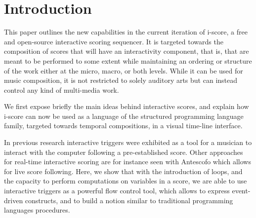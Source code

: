 \documentclass{article}
\title{\papertitle}
\begin{document}
%
\capstartfalse
\maketitle
\capstarttrue
%
\begin{abstract}
     The development and authoring of interactive music or applications, such as user interfaces for arts \& exhibitions
     has traditionally been done with tools that pertain to two broad metaphors. 
     Cue-based environments work by making groups of parameters and sending them to remote devices, 
     while more interactive applications are generally written in generic art-oriented 
     programming environments, such as Max/MSP, Processing or openFrameworks.
     In this paper, we present the current version of the i-score sequencer. 
     It is an extensive graphical software that bridges the gap between time-based, logic-based and flow-based interactive application authoring tools.
     Built upon a few simple and novel primitives that give to the composer the expressive power of structured programming, i-score provides a time line adapted to the notation of parameter-oriented interactive music, 
     and allows temporal scripting using JavaScript. We present the usage of these primitives, as well as an i-score example of work inspired from music based on polyvalent structure.
\end{abstract}
%

\section{Introduction}\label{sec:introduction}
This paper outlines the new capabilities in the current iteration of i-score, 
a free and open-source interactive scoring sequencer.
It is targeted towards the composition of scores that will have 
an interactivity component, that is, that are meant to be performed 
to some extent while maintaining an ordering or structure of the work either at the micro, macro, or both levels.
While it can be used for music composition, it is not restricted to solely auditory arts
but can instead control any kind of multi-media work.

We first expose briefly the main ideas behind interactive scores, and explain 
how i-score can now be used as a language of the structured programming language 
family, targeted towards temporal compositions, in a visual time-line interface.

In previous research\cite{hogue2014ossia,allombert2006concurrent} interactive triggers 
were exhibited as a tool for a musician to interact with the computer following a pre-established score.
Other approaches for real-time interactive scoring are for instance seen with Antescofo\cite{cont2008antescofo}
 which allows for live score following.
Here, we show that with the introduction of loops, and the capacity to perform computations 
on variables in a score, we are able to use interactive triggers as a powerful flow control tool, which 
allows to express event-driven constructs, and to build a notion similar to traditional programming 
languages procedures.
\end{document}
